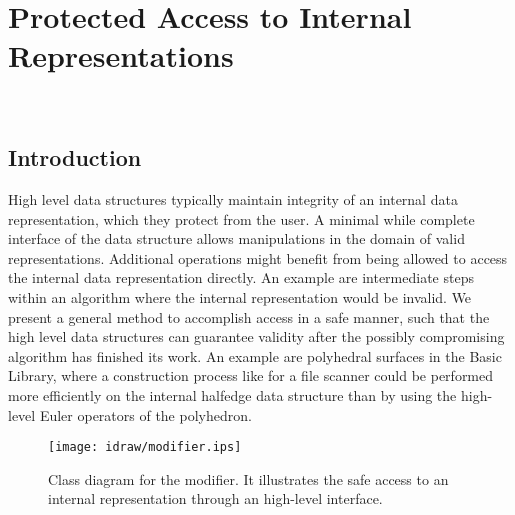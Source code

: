 
\beforecprogskip\medskipamount
\aftercprogskip\medskipamount
\ccParDims

\chapter{Protected Access to Internal Representations}
\label{chapterModifier}
\\

\section{Introduction}

High level data structures typically maintain integrity of an internal
data representation, which they protect from the user. A minimal while
complete interface of the data structure allows manipulations in the
domain of valid representations. Additional operations might benefit
from being allowed to access the internal data representation
directly. An example are intermediate steps within an algorithm where
the internal representation would be invalid. We present a general
method to accomplish access in a safe manner, such that the high level
data structures can guarantee validity after the possibly compromising
algorithm has finished its work. An example are polyhedral surfaces in
the Basic Library, where a construction process like for
a file scanner could be performed more efficiently on the internal
halfedge data structure than by using the high-level Euler operators
of the polyhedron.

\begin{ccTexOnly}
\begin{figure}
    \begin{center}
      \parbox{\textwidth}{%
          \texttt{[image: idraw/modifier.ips]}%
      }
    \end{center}
    \caption{Class diagram for the modifier. It illustrates the
             safe access to an internal representation through an
             high-level interface.}
    \label{figureModifierDesign}
\end{figure}
\end{ccTexOnly}

